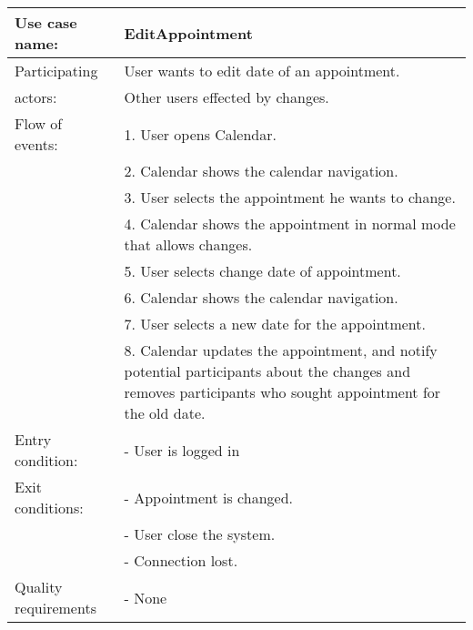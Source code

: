 {\tabulinesep=1.2mm
\begin{tabu}{ | p{3cm} | p{13cm} |}
    \hline
    Use case name: 			& 		EditAppointment\\ \hline
    Participating  			& 		User wants to edit date of an appointment. \\
    actors:					&		Other users effected by changes.\\ \hline
    Flow of events: 		& 		1. User opens Calendar. \\
							&		2. Calendar shows the calendar navigation.\\
							&		3. User selects the appointment he wants to change.\\
							&		4. Calendar shows the appointment in normal mode that allows changes.\\
							&		5. User selects change date of appointment.\\
							&		6. Calendar shows the calendar navigation.\\
							&		7. User selects a new date for the appointment.\\
							&		8. Calendar updates the appointment, and notify potential participants about the changes and removes participants who sought appointment for the old 			date.\\ \hline
    Entry condition: 		& 		- User is logged in  \\ \hline
	Exit conditions: 		&		- Appointment is changed.\\
							&		- User close the system.\\
							&		- Connection lost.\\\hline
	Quality requirements	&	 	- None \\\hline
\end{tabu}
}